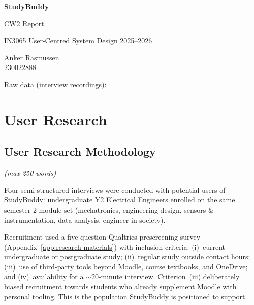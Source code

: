 \documentclass[a4paper,11pt]{article}
\newcommand{\wclimit}[1]{\hfill\textit{\footnotesize(max #1 words)}}
\newcommand{\MYhref}[3][blue]{\href{#2}{\color{#1}{#3}}}%
\begin{document}
\begin{titlepage}
    \centering
    \vspace*{3cm}
    {\LARGE\bfseries StudyBuddy\par}
    \vspace{0.4cm}
    {\Large CW2 Report\par}
    \vspace{1.5cm}
    {\large IN3065 User-Centred System Design 2025--2026\par}
    \vspace{1cm}
    {\large Anker Rasmussen \\230022888\par}
    \vspace{1.5cm}
    {\normalsize Raw data (interview recordings):
    \MYhref{https://cityuni-my.sharepoint.com/:f:/g/personal/anker_rasmussen_city_ac_uk/IgDGVR9azIIOTK3t1XU7LSTyAUYfGKY0C_x_EShOPKYeH2k?e=O9kAHL}{OneDrive folder (City login required)}\par}
    \vfill
    \newpage
    \tableofcontents
    \vspace{2cm}
\end{titlepage}

\newpage
\section{User Research}
\subsection{User Research Methodology}\label{sec:methodology}
\wclimit{250}

Four semi-structured interviews were conducted with potential users
of StudyBuddy: undergraduate Y2 Electrical Engineers enrolled on the
same semester-2 module set (mechatronics, engineering design,
sensors \& instrumentation, data analysis, engineer in society).

Recruitment used a five-question Qualtrics prescreening survey
(Appendix~\ref{app:research-materials}) with inclusion criteria:
(i)~current undergraduate or postgraduate study; (ii)~regular study
outside contact hours; (iii)~use of third-party tools beyond Moodle,
course textbooks, and OneDrive; and (iv)~availability for a
${\sim}20$-minute interview. Criterion~(iii) deliberately biased
recruitment towards students who already supplement Moodle with
personal tooling. This is the population StudyBuddy is positioned to
support.
\end{document}
